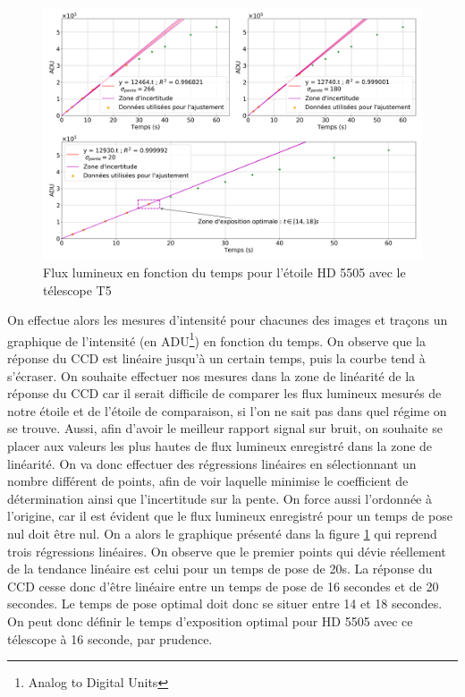 \documentclass[10pt,french, openany]{book}
\begin{document}
    
    \begin{figure}[h!]
        \centering
        \includegraphics[width = \textwidth]{graph_temps_de_pose}
        \caption{Flux lumineux en fonction du temps pour l'étoile HD 5505 avec le télescope T5}
        \label{fig:graph_temps_de_pose}
    \end{figure}
    
    On effectue alors les mesures d'intensité pour chacunes des images et traçons un graphique de l'intensité (en ADU\footnote{Analog to Digital Units}) en fonction du temps. On observe que la réponse du CCD est linéaire jusqu'à un certain temps, puis la courbe tend à s'écraser. On souhaite effectuer nos mesures dans la zone de linéarité de la réponse du CCD car il serait difficile de comparer les flux lumineux mesurés de notre étoile et de l'étoile de comparaison, si l'on ne sait pas dans quel régime on se trouve. Aussi, afin d'avoir le meilleur rapport signal sur bruit, on souhaite se placer aux valeurs les plus hautes de flux lumineux enregistré dans la zone de linéarité. On va donc effectuer des régressions linéaires en sélectionnant un nombre différent de points, afin de voir laquelle minimise le coefficient de détermination ainsi que l'incertitude sur la pente. On force aussi l'ordonnée à l'origine, car il est évident que le flux lumineux enregistré pour un temps de pose nul doit être nul. On a alors le graphique présenté dans la figure \ref{fig:graph_temps_de_pose} qui reprend trois régressions linéaires. On observe que le premier points qui dévie réellement de la tendance linéaire est celui pour un temps de pose de 20s. La réponse du CCD cesse donc d'être linéaire entre un temps de pose de 16 secondes et de 20 secondes. Le temps de pose optimal doit donc se situer entre 14 et 18 secondes. On peut donc définir le temps d'exposition optimal pour HD 5505 avec ce télescope à 16 seconde, par prudence.
\end{document}
